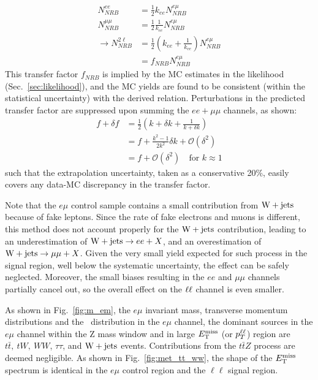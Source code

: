 \begin{equation}
\begin{split}
  N^{ee}_{NRB}     &= \frac{1}{2} k_{ee} N^{e\mu}_{NRB} \\
  N^{\mu\mu}_{NRB} &= \frac{1}{2} \frac{1}{k_{ee}} N^{e\mu}_{NRB} \\
\rightarrow N^{2\ell}_{NRB}  &= \frac{1}{2} \left( k_{ee} + \frac{1}{k_{ee}} \right) N^{e\mu}_{NRB} \\
&= f_{NRB} N^{e\mu}_{NRB}
\end{split}
\end{equation}
This transfer factor $f_{NRB}$ is implied by the MC estimates in the likelihood (Sec.~\ref{sec:likelihood}),
and the MC yields are found to be consistent (within the statistical uncertainty) with the derived relation.
Perturbations in the predicted transfer factor are suppressed upon summing the $ee+\mu\mu$ channels, as shown:
\begin{equation}
\begin{split}
  f + \delta f &= \frac{1}{2} \left( k + \delta k + \frac{1}{k + \delta k} \right) \\
  &= f + \frac{k^2-1}{2k^2} \delta k + \mathcal{O}(\delta^2) \\
  &= f + \mathcal{O}(\delta^2) \quad \text{for } k \approx 1
\end{split}
\end{equation}
such that the extrapolation uncertainty, taken as a conservative 20\%, easily covers any data-MC discrepancy
in the transfer factor.

Note that the $e\mu$ control sample contains a small contribution from
$\mathrm{W}+{\mathrm{jets}}$ because of fake leptons. Since the rate of fake
electrons and muons is different, this method does not account
properly for the $\mathrm{W}+{\mathrm{jets}}$ contribution, leading to an
underestimation of $\mathrm{W}+{\mathrm{jets}}\to ee+X$, and an
overestimation of $\mathrm{W}+{\mathrm{jets}}\to \mu\mu+X$. Given the very 
small yield expected for such process in the signal region, well below
the systematic uncertainty, the effect can be safely
neglected. Moreover, the small biases resulting in the $ee$ and
$\mu\mu$ channels partially cancel out, so the overall effect on the
$\ell\ell$ channel is even smaller. 

As shown in Fig.~\ref{fig:m_em},
the $e\mu$ invariant mass, transverse momentum distributions and the \met\ distribution in
the $e\mu$ channel, the dominant sources in the $e\mu$ channel within
the Z mass window and in large $E_{\mathrm{T}}^{\text{miss}}$ (or $p_{T}^{\ell\ell}$) region are
$t\bar t, \ tW, \ WW $, $\tau\tau$, and $\mathrm{W}+{\mathrm{jets}}$ events. Contributions from the $t\bar t Z$ process
are deemed negligible.
As shown in Fig.~\ref{fig:met_tt_ww}, the shape of the $E_\mathrm{T}^{\mathrm{miss}}$ spectrum is identical in the $e\mu$ control region
and the $\ell\ell$ signal region.


